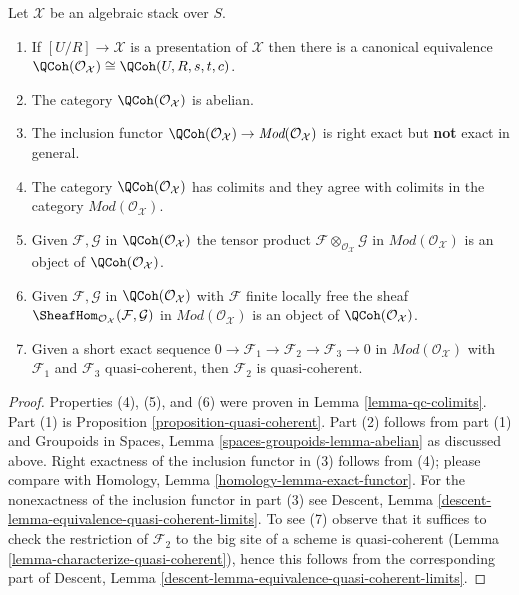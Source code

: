 \begin{lemma}
\label{lemma-quasi-coherent-algebraic-stack}
Let $\mathcal{X}$ be an algebraic stack over $S$.
\begin{enumerate}
\item If $[U/R] \to \mathcal{X}$ is a presentation of $\mathcal{X}$
then there is a canonical equivalence
$\QCoh(\mathcal{O}_\mathcal{X}) \cong
\QCoh(U, R, s, t, c)$.
\item The category $\QCoh(\mathcal{O}_\mathcal{X})$ is abelian.
\item The inclusion functor $\QCoh(\mathcal{O}_\mathcal{X}) \to
\textit{Mod}(\mathcal{O}_\mathcal{X})$ is right exact but
{\bf not} exact in general.
\item The category $\QCoh(\mathcal{O}_\mathcal{X})$
has colimits and they agree with colimits in the category
$\textit{Mod}(\mathcal{O}_\mathcal{X})$.
\item Given $\mathcal{F}, \mathcal{G}$ in
$\QCoh(\mathcal{O}_\mathcal{X})$
the tensor product $\mathcal{F} \otimes_{\mathcal{O}_\mathcal{X}} \mathcal{G}$
in $\textit{Mod}(\mathcal{O}_\mathcal{X})$
is an object of $\QCoh(\mathcal{O}_\mathcal{X})$.
\item Given $\mathcal{F}, \mathcal{G}$ in
$\QCoh(\mathcal{O}_\mathcal{X})$
with $\mathcal{F}$ finite locally free the sheaf
$\SheafHom_{\mathcal{O}_\mathcal{X}}(\mathcal{F}, \mathcal{G})$
in $\textit{Mod}(\mathcal{O}_\mathcal{X})$
is an object of $\QCoh(\mathcal{O}_\mathcal{X})$.
\item Given a short exact sequence
$0 \to \mathcal{F}_1 \to \mathcal{F}_2 \to \mathcal{F}_3 \to 0$
in $\textit{Mod}(\mathcal{O}_\mathcal{X})$
with $\mathcal{F}_1$ and $\mathcal{F}_3$ quasi-coherent, then
$\mathcal{F}_2$ is quasi-coherent.
\end{enumerate}
\end{lemma}

\begin{proof}
Properties (4), (5), and (6) were proven in
Lemma \ref{lemma-qc-colimits}.
Part (1) is
Proposition \ref{proposition-quasi-coherent}.
Part (2) follows from part (1) and
Groupoids in Spaces, Lemma \ref{spaces-groupoids-lemma-abelian}
as discussed above. Right exactness of the inclusion functor
in (3) follows from (4); please compare with
Homology, Lemma \ref{homology-lemma-exact-functor}.
For the nonexactness of the inclusion functor in part (3) see
Descent, Lemma \ref{descent-lemma-equivalence-quasi-coherent-limits}.
To see (7) observe that it suffices to check the restriction
of $\mathcal{F}_2$ to the big site of a scheme is quasi-coherent
(Lemma \ref{lemma-characterize-quasi-coherent}),
hence this follows from the corresponding part of
Descent, Lemma \ref{descent-lemma-equivalence-quasi-coherent-limits}.
\end{proof}

